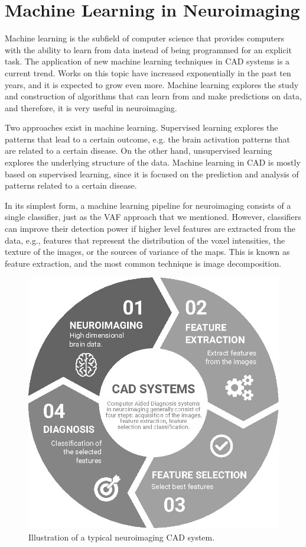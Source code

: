 \section{Machine Learning in Neuroimaging}\label{sec:machinelearning}
Machine learning is the subfield of computer science that provides computers with the ability to learn from data instead of being programmed for an explicit task. 
The application of new machine learning techniques in CAD systems is a current trend. Works on this topic have increased exponentially in the past ten years, and it is expected to grow even more. Machine learning explores the study and construction of algorithms that can learn from and make predictions on data, and therefore, it is very useful in neuroimaging. 

Two approaches exist in machine learning. Supervised learning explores the patterns that lead to a certain outcome, e.g. the brain activation patterns that are related to a certain disease. On the other hand, unsupervised learning explores the underlying structure of the data. Machine learning in CAD is mostly based on supervised learning, since it is focused on the prediction and analysis of patterns related to a certain disease. 

In its simplest form, a machine learning pipeline for neuroimaging consists of a single classifier, just as the VAF approach that we mentioned. However, classifiers can improve their detection power if higher level features are extracted from the data, e.g., features that represent the distribution of the voxel intensities, the texture of the images, or the sources of variance of the maps. This is known as feature extraction, and the most common technique is image decomposition. 


\begin{figure}[htp]
	\centering
	\includegraphics[width=0.5\linewidth]{Graphics/ch2/NI-CAD}
	\caption[Illustration of a typical neuroimaging CAD system.]{Illustration of a typical neuroimaging CAD system.}
	\label{fig:ni-cad}
\end{figure}

